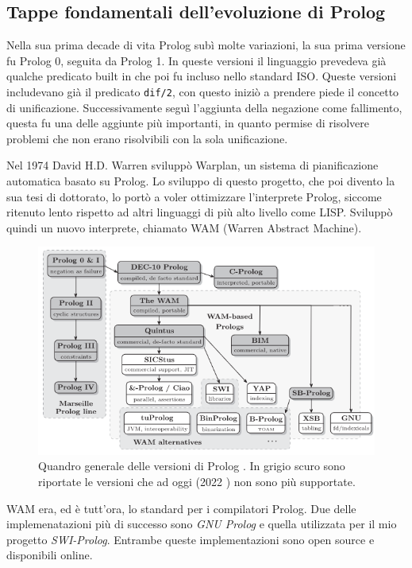 \subsection{Tappe fondamentali dell'evoluzione di Prolog}
\label{subsec:tappe}
Nella sua prima decade di vita Prolog subì molte variazioni, la sua prima versione fu Prolog 0, seguita da Prolog 1. In queste versioni il linguaggio
prevedeva già qualche predicato built in che poi fu incluso nello standard ISO. Queste versioni includevano già il predicato \verb+dif/2+, con questo iniziò a prendere piede il concetto di unificazione. Successivamente seguì l'aggiunta
della negazione come fallimento, questa fu una delle aggiunte più importanti, in quanto permise di risolvere problemi che non erano risolvibili con la sola unificazione.

Nel 1974 David H.D. Warren sviluppò Warplan, un sistema di pianificazione automatica basato su Prolog. Lo sviluppo di questo progetto, che poi divento la sua tesi di dottorato, lo portò a voler ottimizzare l'interprete Prolog, siccome ritenuto lento rispetto ad altri linguaggi di più alto livello come LISP.
Sviluppò quindi un nuovo interprete, chiamato WAM (Warren Abstract Machine).

\begin{figure}[h!]
    \centering
    \includegraphics[scale=0.55]{images/prologimpl.png}
    \caption{Quandro generale delle versioni di Prolog \cite{korner2022fifty}. In grigio scuro sono riportate le versioni che ad oggi (2022 \cite{korner2022fifty}) non sono più supportate.}
    \label{fig:prologimpl}
\end{figure}

WAM era, ed è tutt'ora, lo standard per i compilatori Prolog. Due delle implemenatazioni più di successo 
sono \textit{GNU Prolog} e quella utilizzata per il mio progetto \textit{SWI-Prolog}. Entrambe queste implementazioni sono open source e disponibili online.

